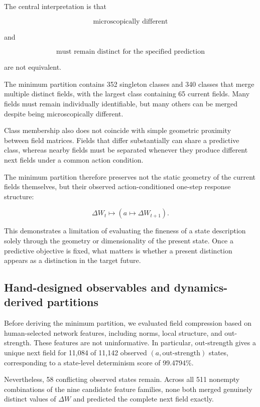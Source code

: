 \documentclass[
  11pt,
]{article}
\begin{document}
The central interpretation is that

\[{\text{microscopically different}}\]

and

\[{\text{must remain distinct for the specified prediction}}\]

are not equivalent.

The minimum partition contains 352 singleton classes and 340 classes
that merge multiple distinct fields, with the largest class containing
65 current fields. Many fields must remain individually identifiable,
but many others can be merged despite being microscopically different.

Class membership also does not coincide with simple geometric proximity
between field matrices. Fields that differ substantially can share a
predictive class, whereas nearby fields must be separated whenever they
produce different next fields under a common action condition.

The minimum partition therefore preserves not the static geometry of the
current fields themselves, but their observed action-conditioned
one-step response structure:

\[{\Delta W_t\longmapsto\left(a\longmapsto\Delta W_{t+1}\right).}\]

This demonstrates a limitation of evaluating the fineness of a state
description solely through the geometry or dimensionality of the present
state. Once a predictive objective is fixed, what matters is whether a
present distinction appears as a distinction in the target future.

\hypertarget{hand-designed-observables-and-dynamics-derived-partitions}{%
\subsection{Hand-designed observables and dynamics-derived
partitions}\label{hand-designed-observables-and-dynamics-derived-partitions}}

Before deriving the minimum partition, we evaluated field compression
based on human-selected network features, including norms, local
structure, and out-strength. These features are not uninformative. In
particular, out-strength gives a unique next field for 11,084 of 11,142
observed \({(a,\mathrm{out\mbox{-}strength})}\) states, corresponding to
a state-level determinism score of 99.4794\%.

Nevertheless, 58 conflicting observed states remain. Across all 511
nonempty combinations of the nine candidate feature families, none both
merged genuinely distinct values of \({\Delta W}\) and predicted the
complete next field exactly.
\end{document}
